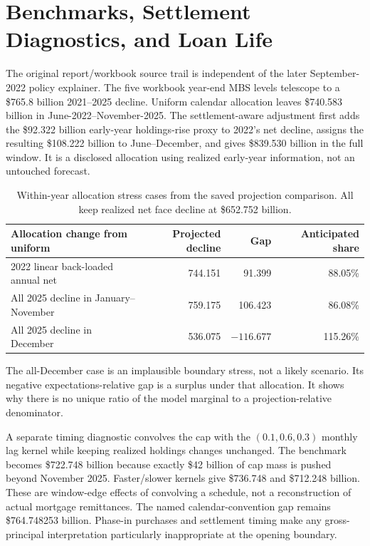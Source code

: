 

\section{Benchmarks, Settlement Diagnostics, and Loan Life}\label{app:benchmark}

The original report/workbook source trail is independent of the later September-2022 policy explainer. The five workbook year-end MBS levels telescope to a \$765.8 billion 2021--2025 decline. Uniform calendar allocation leaves \$740.583 billion in June-2022--November-2025. The settlement-aware adjustment first adds the \$92.322 billion early-year holdings-rise proxy to 2022's net decline, assigns the resulting \$108.222 billion to June--December, and gives \$839.530 billion in the full window. It is a disclosed allocation using realized early-year information, not an untouched forecast.

\begin{table}[H]
\centering\small
\caption{Within-year allocation stress cases from the saved projection comparison. All keep realized net face decline at \$652.752 billion.}
\label{tab:allocationstress}
\begin{tabular}{@{}p{7cm}rrr@{}}\toprule
Allocation change from uniform & Projected decline & Gap & Anticipated share\\\midrule
2022 linear back-loaded annual net & 744.151 & 91.399 & 88.05\%\\
All 2025 decline in January--November & 759.175 & 106.423 & 86.08\%\\
All 2025 decline in December & 536.075 & $-116.677$ & 115.26\%\\\bottomrule
\end{tabular}
\end{table}

The all-December case is an implausible boundary stress, not a likely scenario. Its negative expectations-relative gap is a surplus under that allocation. It shows why there is no unique ratio of the model marginal to a projection-relative denominator.

A separate timing diagnostic convolves the cap with the $(0.1,0.6,0.3)$ monthly lag kernel while keeping realized holdings changes unchanged. The benchmark becomes \$722.748 billion because exactly \$42 billion of cap mass is pushed beyond November 2025. Faster/slower kernels give \$736.748 and \$712.248 billion. These are window-edge effects of convolving a schedule, not a reconstruction of actual mortgage remittances. The named calendar-convention gap remains \$764.748253 billion. Phase-in purchases and settlement timing make any gross-principal interpretation particularly inappropriate at the opening boundary.

